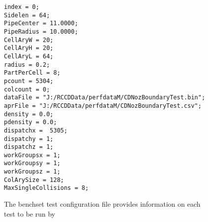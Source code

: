 
\begin{figure}
\centering
\lstset{style=gpucode,linewidth=6.5in,xleftmargin=0.25in}

\begin{lstlisting}
index = 0;
Sidelen = 64;
PipeCenter = 11.0000;
PipeRadius = 10.0000;
CellAryW = 20;
CellAryH = 20;
CellAryL = 64;
radius = 0.2;
PartPerCell = 8;
pcount = 5304;
colcount = 0;
dataFile = "J:/RCCDData/perfdataM/CDNozBoundaryTest.bin";
aprFile = "J:/RCCDData/perfdataM/CDNozBoundaryTest.csv";
density = 0.0;
pdensity = 0.0;
dispatchx =  5305;
dispatchy = 1;
dispatchz = 1;
workGroupsx = 1;
workGroupsy = 1;
workGroupsz = 1;
ColArySize = 128;
MaxSingleCollisions = 8;

\end{lstlisting}


\caption[Benchset test configuration file]{The benchset test configuration file provides information on each test to be run by \app{} }
\label{fig:tstfile}
\end{figure}
